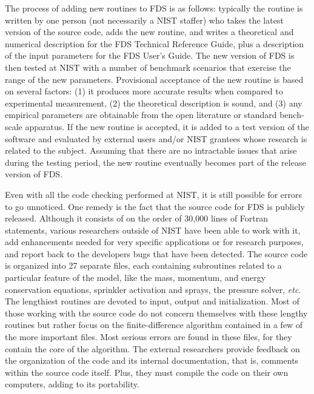\documentclass[11pt]{book}
\begin{document}
The process of adding new routines to FDS is as follows: typically the routine is written by one person (not necessarily a NIST staffer) who takes
the latest version of the source code, adds the new routine, and writes a theoretical and numerical description for the FDS Technical Reference
Guide, plus a description of the input parameters for the FDS User's Guide. The new version of FDS is then tested at NIST with a number of benchmark
scenarios that exercise the range of the new parameters.  Provisional acceptance of the new routine is based on several factors: (1) it produces more
accurate results when compared to experimental measurement, (2) the theoretical description is sound, and (3) any empirical parameters are obtainable
from the open literature or standard bench-scale apparatus.  If the new routine is accepted, it is added to a test version of the software and
evaluated by external users and/or NIST grantees whose research is related to the subject. Assuming that there are no intractable issues that arise
during the testing period, the new routine eventually becomes part of the release version of FDS.

Even with all the code checking performed at NIST, it is still possible for errors to go unnoticed. One remedy is the fact that the source code for
FDS is publicly released. Although it consists of on the order of 30,000 lines of Fortran statements, various researchers outside of NIST have been
able to work with it, add enhancements needed for very specific applications or for research purposes, and report back to the developers bugs that
have been detected. The source code is organized into 27 separate files, each containing subroutines related to a particular feature of the model,
like the mass, momentum, and energy conservation equations, sprinkler activation and sprays, the pressure solver, {\em etc.} The lengthiest routines
are devoted to input, output and initialization.  Most of those working with the source code do not concern themselves with these lengthy routines
but rather focus on the finite-difference algorithm contained in a few of the more important files. Most serious errors are found in these files, for
they contain the core of the algorithm. The external researchers provide feedback on the organization of the code and its internal documentation,
that is, comments within the source code itself.  Plus, they must compile the code on their own computers, adding to its portability.
\end{document}
